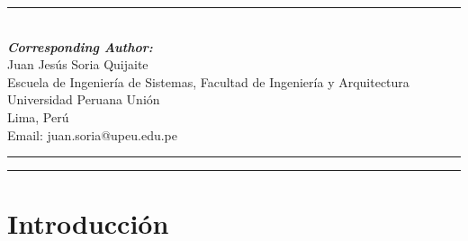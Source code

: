 \documentclass{iaesarticle}
\begin{document}
\parbox[t][][s]{0.65\textwidth}{%
\begin{abstract}
\vspace{.3em}
La escritura manuscrita es una habilidad compleja que involucra componentes grafomotores y cognitivos. La evaluación tradicional se basa en pruebas estandarizadas y valoración visual, lo que limita la captura de características dinámicas. Este estudio tiene como objetivo analizar sistemáticamente las tecnologías de visión computacional y aprendizaje automático (Machine Learning) utilizadas para evaluar habilidades grafomotoras y de escritura en población infantil. Se realizó una revisión sistemática de la literatura (RSL) siguiendo las directrices de Kitchenham y PRISMA 2020. Se realizaron búsquedas en Scopus, Web of Science y ScienceDirect (2016–2026), obteniendo 1,361 registros iniciales. Tras el cribado y la evaluación de calidad, se incluyeron 31 estudios primarios. Los resultados indican un predominio de investigaciones con niños de desarrollo típico. Las Redes Neuronales Convolucionales (CNN) fueron los modelos más utilizados (n=10), seguidas de Random Forest (n=6) y Máquinas de Vectores de Soporte (n=5). El etiquetado humano (ground truth) fue el método de referencia más frecuente, y la exactitud (accuracy) la métrica más reportada (n=21). Si bien los sistemas basados en IA ofrecen herramientas complementarias prometedoras, su utilidad clínica y educativa depende de conjuntos de datos diversos, validación estandarizada e integración de sensores dinámicos. Estas tecnologías deben entenderse como apoyo a docentes y especialistas, no como sustitutos de la evaluación profesional.
\end{abstract}
         }
\parbox[l]{\textwidth}{%
\rule{0.275\textwidth}{0.5pt} \hspace{0.5cm} \hrulefill
\\
\emph{\textbf{Corresponding Author:}}
\vspace{.5em}\\
Juan Jesús Soria Quijaite\\
Escuela de Ingeniería de Sistemas, Facultad de Ingeniería y Arquitectura\\
Universidad Peruana Unión\\
Lima, Perú\\
Email: juan.soria@upeu.edu.pe
}
\vspace{.5em}
\hrule
\vspace{.1em}
\hrule


\section{Introducción}
\label{sec:intro}
\end{document}
